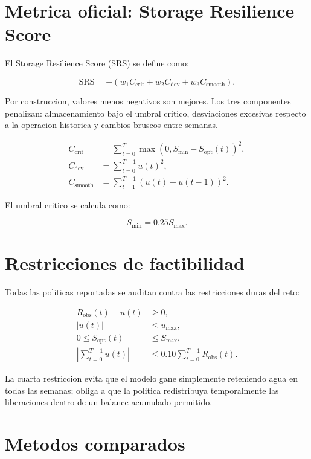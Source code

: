 \documentclass[11pt,letterpaper]{article}
\begin{document}
\section{Metrica oficial: Storage Resilience Score}

El Storage Resilience Score (SRS) se define como:

\begin{equation}
\mathrm{SRS} =
-\left(w_1 C_{\mathrm{crit}} + w_2 C_{\mathrm{dev}} +
w_3 C_{\mathrm{smooth}}\right).
\end{equation}

Por construccion, valores menos negativos son mejores. Los tres componentes
penalizan: almacenamiento bajo el umbral critico, desviaciones excesivas
respecto a la operacion historica y cambios bruscos entre semanas.

\begin{align}
C_{\mathrm{crit}} &=
\sum_{t=0}^{T}
\max(0, S_{\min} - S_{\mathrm{opt}}(t))^2, \\
C_{\mathrm{dev}} &=
\sum_{t=0}^{T-1} u(t)^2, \\
C_{\mathrm{smooth}} &=
\sum_{t=1}^{T-1} (u(t)-u(t-1))^2.
\end{align}

El umbral critico se calcula como:

\begin{equation}
S_{\min}=0.25S_{\max}.
\end{equation}

\section{Restricciones de factibilidad}

Todas las politicas reportadas se auditan contra las restricciones duras del
reto:

\begin{align}
R_{\mathrm{obs}}(t) + u(t) &\geq 0, \\
|u(t)| &\leq u_{\max}, \\
0 \leq S_{\mathrm{opt}}(t) &\leq S_{\max}, \\
\left|\sum_{t=0}^{T-1} u(t)\right| &\leq
0.10\sum_{t=0}^{T-1} R_{\mathrm{obs}}(t).
\end{align}

La cuarta restriccion evita que el modelo gane simplemente reteniendo agua en
todas las semanas; obliga a que la politica redistribuya temporalmente las
liberaciones dentro de un balance acumulado permitido.

\section{Metodos comparados}
\end{document}
